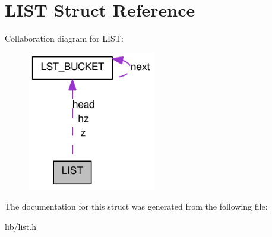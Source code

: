 \hypertarget{structLIST}{
\section{LIST Struct Reference}
\label{structLIST}
}


Collaboration diagram for LIST:\nopagebreak
\begin{figure}[H]
\begin{center}
\leavevmode
\includegraphics[width=159pt]{structLIST__coll__graph}
\end{center}
\end{figure}


The documentation for this struct was generated from the following file:\begin{DoxyCompactItemize}
\item 
lib/list.h\end{DoxyCompactItemize}
